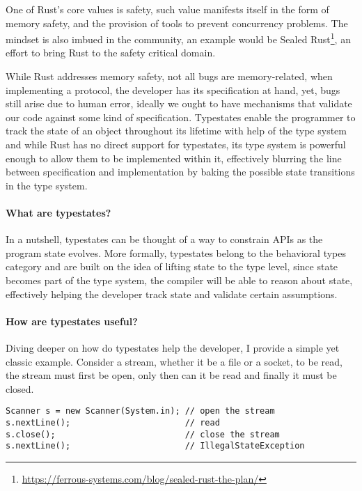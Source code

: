 \documentclass{article}
\begin{document}
One of Rust's core values is safety,
such value manifests itself in the form of memory safety,
and the provision of tools to prevent concurrency problems.
The mindset is also imbued in the community,
an example would be Sealed Rust\footnote{\url{https://ferrous-systems.com/blog/sealed-rust-the-plan/}},
an effort to bring Rust to the safety critical domain.

While Rust addresses memory safety, not all bugs are memory-related,
when implementing a protocol, the developer has its specification at hand, yet, bugs still arise due to human error,
ideally we ought to have mechanisms that validate our code against some kind of specification.
Typestates enable the programmer to track the state of an object throughout its lifetime with help of the type system
and while Rust has no direct support for typestates,
its type system is powerful enough to allow them to be implemented within it,
effectively blurring the line between specification and implementation by baking the possible state transitions in the type system.

\paragraph{What are typestates?}

In a nutshell, typestates can be thought of a way to constrain APIs as the program state evolves.
More formally, typestates belong to the behavioral types category and are built on the idea of lifting state to the type level,
since state becomes part of the type system, the compiler will be able to reason about state,
effectively helping the developer track state and validate certain assumptions.

\paragraph{How are typestates useful?}

Diving deeper on how do typestates help the developer, I provide a simple yet classic example.
Consider a stream, whether it be a file or a socket, to be read, the stream must first be open,
only then can it be read and finally it must be closed.

\begin{verbatim}
Scanner s = new Scanner(System.in); // open the stream
s.nextLine();                       // read
s.close();                          // close the stream
s.nextLine();                       // IllegalStateException
\end{verbatim}
\end{document}
